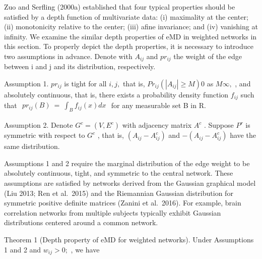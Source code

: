 \documentclass[
  10
]{article}
\begin{document}
Zuo and Serfling (2000a) established that four typical properties should
be satisfied by a depth function of multivariate data: (i) maximality at
the center; (ii) monotonicity relative to the center; (iii) afine
invariance; and (iv) vanishing at infinity. We examine the similar depth
properties of eMD in weighted networks in this section. To properly
depict the depth properties, it is necessary to introduce two
assumptions in advance. Denote with \(A _ { i j }\) and
\(p r _ { i j }\) the weight of the edge between i and j and its
distribution, respectively.

Assumption 1. \(p r _ { i j }\) is tight for all \(i , j ,\) that is,
\(P r _ { i j } ( | A _ { i j } | \geq M )  0\) as \(M  \infty ,\) , and
absolutely continuous, that is, there exists a probability density
function \(f _ { i j }\) such that
\(\begin{array} { r } { p r _ { i j } ( B ) \ = \ \int _ { B } f _ { i j } ( x ) d x } \end{array}\)
for any measurable set B in R.

Assumption 2. Denote \(G ^ { c } = ( V , E ^ { c } )\) with adjacency
matrix \(A ^ { c }\) . Suppose \(P ^ { r }\) is symmetric with respect
to \(G ^ { c }\) , that is, \(( A _ { i j } - A _ { i j } ^ { c } )\)
and \(- ( A _ { i j } - A _ { i j } ^ { c } )\) have the same
distribution.

Assumptions 1 and 2 require the marginal distribution of the edge weight
to be absolutely continuous, tight, and symmetric to the central
network. These assumptions are satisfied by networks derived from the
Gaussian graphical model (Liu 2013; Ren et al.~2015) and the Riemannian
Gaussian distribution for symmetric positive definite matrices (Zanini
et al.~2016). For example, brain correlation networks from multiple
subjects typically exhibit Gaussian distributions centered around a
common network.

Theorem 1 (Depth property of eMD for weighted networks). Under
Assumptions 1 and 2 and \(w _ { i j } > 0 ;\) , we have
\end{document}
